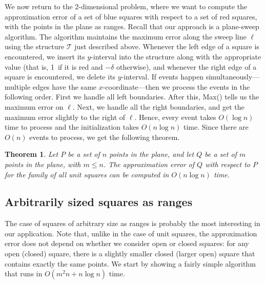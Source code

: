 \documentclass{elsart}
\newcommand{\tree}{{\mathcal T}}
\newtheorem{theorem}[definition]{Theorem}
\begin{document}
We now return to the 2-dimensional problem, where we want to compute
the approximation error of a set of blue squares with respect to a set
of red squares, with the points in the plane as ranges. Recall that
our approach is a plane-sweep algorithm. The algorithm maintains the
maximum error along the sweep line $\ell$ using the structure $\tree$
just described above. Whenever the left edge of a square is
encountered, we insert its $y$-interval into the structure along with
the appropriate value (that is, 1~if it is red and $-\delta$ otherwise),
and whenever the right edge of a square is encountered, we delete its
$y$-interval. If events happen simultaneously---multiple edges have
the same $x$-coordinate---then we process the events in the following
order. First we handle all left boundaries. After this, Max() tells
us the maximum error on $\ell$. Next, we handle all the right
boundaries, and get the maximum error slightly to the right of
$\ell$. Hence, every event takes $O(\log n)$ time to process and the
initialization takes $O(n\log n)$ time. Since there are $O(n)$ events
to process, we get the following theorem.
\begin{theorem}\label{th:unitsquares}
  Let $P$ be a set of $n$ points in the plane, and let $Q$ be a set of
  $m$ points in the plane, with $m \leq n$.  The approximation error
  of $Q$ with respect to $P$ for the family of all unit squares can be
  computed in $O(n\log n)$ time.
\end{theorem}



\subsection{Arbitrarily sized squares as ranges}
\label{subse:squares}
The case of squares of arbitrary size as ranges is probably the most
interesting in our application.
Note that, unlike in the case of unit squares, the approximation error does not
depend on whether we consider open or closed squares: for any open (closed)
square, there is a slightly smaller closed (larger open) square
that contains exactly the same points.
We start by showing a fairly simple
algorithm that runs in $O(m^2n +n\log n)$ time.
\end{document}
